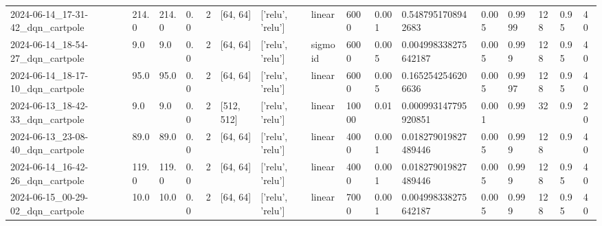 \documentclass[a4paper,12pt]{article}
\begin{document}
\begin{table}[]
\begin{tabular}{llllllllllllllll}
    2024-06-14\_17-31-42\_dqn\_cartpole & 214.0                 & 214.0                   & 0.0                    & 2              & {[}64, 64{]}             & {[}'relu', 'relu'{]}                 & linear                    & 6000          & 0.001          & 0.5487951708942683   & 0.005        & 0.9999         & 128         & 0.95     & 40                    \\
    2024-06-14\_18-54-27\_dqn\_cartpole & 9.0                   & 9.0                     & 0.0                    & 2              & {[}64, 64{]}             & {[}'relu', 'relu'{]}                 & sigmoid                   & 6000          & 0.005          & 0.004998338275642187 & 0.005        & 0.999          & 128         & 0.95     & 40                    \\
    2024-06-14\_18-17-10\_dqn\_cartpole & 95.0                  & 95.0                    & 0.0                    & 2              & {[}64, 64{]}             & {[}'relu', 'relu'{]}                 & linear                    & 6000          & 0.005          & 0.1652542546206636   & 0.005        & 0.9997         & 128         & 0.95     & 40                    \\
    2024-06-13\_18-42-33\_dqn\_cartpole & 9.0                   & 9.0                     & 0.0                    & 2              & {[}512, 512{]}           & {[}'relu', 'relu'{]}                 & linear                    & 10000         & 0.01           & 0.000993147795920851 & 0.001        & 0.99           & 32          & 0.9      & 20                    \\
    2024-06-13\_23-08-40\_dqn\_cartpole & 89.0                  & 89.0                    & 0.0                    & 2              & {[}64, 64{]}             & {[}'relu', 'relu'{]}                 & linear                    & 4000          & 0.001          & 0.018279019827489446 & 0.005        & 0.999          & 128         & 0.9      & 40                    \\
    2024-06-14\_16-42-26\_dqn\_cartpole & 119.0                 & 119.0                   & 0.0                    & 2              & {[}64, 64{]}             & {[}'relu', 'relu'{]}                 & linear                    & 4000          & 0.001          & 0.018279019827489446 & 0.005        & 0.999          & 128         & 0.95     & 40                    \\
    2024-06-15\_00-29-02\_dqn\_cartpole & 10.0                  & 10.0                    & 0.0                    & 2              & {[}64, 64{]}             & {[}'relu', 'relu'{]}                 & linear                    & 7000          & 0.001          & 0.004998338275642187 & 0.005        & 0.999          & 128         & 0.95     & 40                    \\

\end{tabular}
\end{table}
\end{document}
